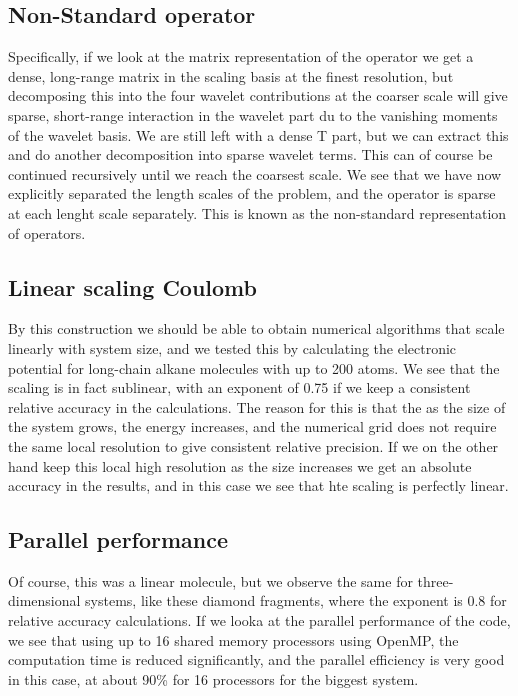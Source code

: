 \documentclass [a4paper]{report}
\begin{document}
\subsection*{Non-Standard operator}
Specifically, if we look at the matrix representation of the operator we get a dense, long-range
matrix in the scaling basis at the finest resolution, but decomposing this into the four wavelet
contributions at the coarser scale will give sparse, short-range interaction in the wavelet part
du to the vanishing moments of the wavelet basis. We are still left with a dense T part, but we 
can extract this and do another decomposition into sparse wavelet terms. This can of course be
continued recursively until we reach the coarsest scale. We see that we have now explicitly 
separated the length scales of the problem, and the operator is sparse at each lenght scale 
separately. This is known as the non-standard representation of operators.

\subsection*{Linear scaling Coulomb}
By this construction we should be able to obtain numerical algorithms that scale linearly with 
system size, and we tested this by calculating the electronic potential for long-chain alkane
molecules with up to 200 atoms. We see that the scaling is in fact sublinear, with an exponent 
of 0.75 if we keep a consistent relative accuracy in the calculations. The reason for this is
that the as the size of the system grows, the energy increases, and the numerical grid does
not require the same local resolution to give consistent relative precision. If we on the other
hand keep this local high resolution as the size increases we get an absolute accuracy in the
results, and in this case we see that hte scaling is perfectly linear.

\subsection*{Parallel performance}
Of course, this was a linear molecule, but we observe the same for three-dimensional systems,
like these diamond fragments, where the exponent is 0.8 for relative accuracy calculations.
If we looka at the parallel performance of the code, we see that using up to 16 shared memory
processors using OpenMP, the computation time is reduced significantly, and the parallel
efficiency is very good in this case, at about 90\% for 16 processors for the biggest system.
\end{document}
